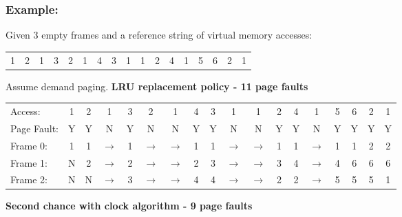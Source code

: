 \documentclass{report}
\begin{document}
\subsubsection{Example:}
Given 3 empty frames and a reference string of virtual memory accesses:
\begin{center}
	\begin{tabular}{c c c c c c c c c c c c c c c c c}
		1 & 2 & 1 & 3 & 2 & 1 & 4 & 3 & 1 & 1 & 2 & 4 & 1 & 5 & 6 & 2 & 1 \\
	\end{tabular}
\end{center}
Assume demand paging.
\textbf{LRU replacement policy - 11 page faults}
\begin{center}
	\begin{tabular}{l c c c c c c c c c c c c c c c c c}
		Access:     & 1 & 2 & 1     & 3 & 2     & 1     & 4 & 3 & 1     & 1     & 2 & 4 & 1     & 5 & 6 & 2 & 1 \\
		Page Fault: & Y & Y & N     & Y & N     & N     & Y & Y & N     & N     & Y & Y & N     & Y & Y & Y & Y \\
		Frame 0:    & 1 & 1 & $\to$ & 1 & $\to$ & $\to$ & 1 & 1 & $\to$ & $\to$ & 1 & 1 & $\to$ & 1 & 1 & 2 & 2 \\
		Frame 1:    & N & 2 & $\to$ & 2 & $\to$ & $\to$ & 2 & 3 & $\to$ & $\to$ & 3 & 4 & $\to$ & 4 & 6 & 6 & 6 \\
		Frame 2:    & N & N & $\to$ & 3 & $\to$ & $\to$ & 4 & 4 & $\to$ & $\to$ & 2 & 2 & $\to$ & 5 & 5 & 5 & 1 \\
	\end{tabular}
\end{center}
\textbf{Second chance with clock algorithm - 9 page faults}
\end{document}
